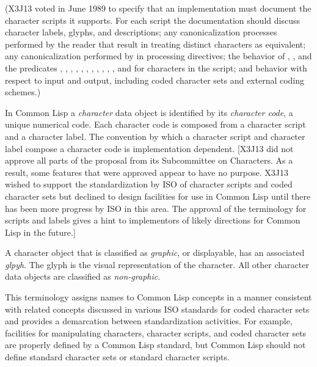 \begin{newer}
(X3J13 voted in June 1989  to specify that
an implementation must document the character scripts it supports.
For each script the documentation should discuss character labels,
glyphs, and descriptions; any canonicalization processes performed
by the reader that result in treating distinct characters as equivalent;
any canonicalization performed by  in processing directives;
the behavior of , , and the predicates
, , , ,
, , , ,
, , , and 
for characters in the script; and behavior with respect to input and output,
including coded character sets and external coding schemes.)

In Common Lisp a \emph{character} data object is identified by its \emph{character code},
a unique numerical code.  Each character code is composed from a character script
and a character label.  The convention by which a character script and
character label compose a character code is implementation dependent.
[X3J13 did not approve all parts of the proposal from its Subcommittee
on Characters.  As a result, some features that were approved appear to
have no purpose.  X3J13 wished to support the standardization by ISO of character
scripts and coded character sets but declined to design facilities for use in
Common Lisp until there has been more progress by ISO in this area.
The approval of the terminology for scripts and labels gives a hint
to implementors of likely directions for Common Lisp in the future.]

A character object that is classified as \emph{graphic}, or displayable,
has an associated \emph{glpyh}.  The glyph is the visual representation
of the character.  All other character data objects are classified as
\emph{non-graphic}.

This terminology assigns names to Common Lisp concepts
in a manner consistent with
related concepts discussed in various ISO standards for coded
character sets and provides a demarcation between standardization
activities.  For example, facilities for manipulating characters,
character scripts, and coded character sets are properly defined
by a Common Lisp standard, but Common Lisp should not define
standard character sets or standard character scripts.
\end{newer}

